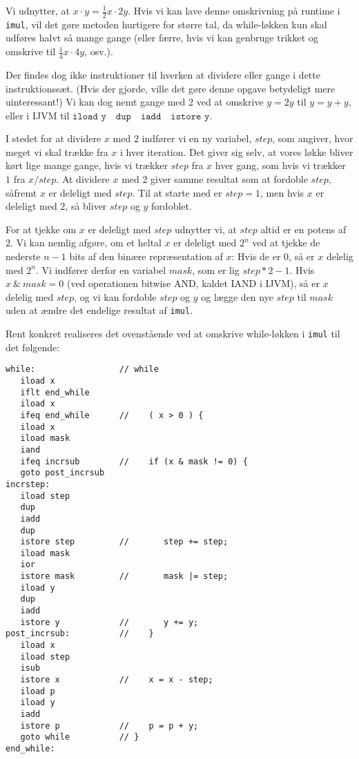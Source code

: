 \documentclass[12pt,a4paper]{article}
\newcommand{\imul}{\texttt{imul}}
\begin{document}
Vi udnytter, at $x\cdot y=\frac 12x\cdot2y$. Hvis vi kan lave denne omskrivning
på runtime i \imul{}, vil det gøre metoden hurtigere for større tal, da
while-løkken kun skal udføres halvt så mange gange (eller færre, hvis vi kan
genbruge trikket og omskrive til $\frac14x\cdot4y$, osv.).

Der findes dog ikke instruktioner til hverken at dividere eller gange i dette
instruktionssæt. (Hvis der gjorde, ville det gøre denne opgave betydeligt mere
uinteressant!) Vi kan dog nemt gange med 2 ved at omskrive $y=2y$ til
$y=y+y$, eller i IJVM til $\texttt{iload y} \quad \texttt{dup} \quad
\texttt{iadd} \quad \texttt{istore y}$.

I stedet for at dividere $x$ med $2$ indfører vi en ny variabel, $step$, som
angiver, hvor meget vi skal trække fra $x$ i hver iteration. Det giver sig
selv, at vores løkke bliver kørt lige mange gange, hvis vi trækker $step$ fra
$x$ hver gang, som hvis vi trækker $1$ fra $x/step$. At dividere $x$ med 2
giver samme resultat som at fordoble $step$, såfremt $x$ er deleligt med
$step$. Til at starte med er $step=1$, men hvis $x$ er deleligt med $2$, så
bliver $step$ og $y$ fordoblet.

For at tjekke om $x$ er deleligt med $step$ udnytter vi, at $step$ altid er en
potens af $2$. Vi kan nemlig afgøre, om et heltal $x$ er deleligt med $2^n$ ved
at tjekke de nederste $n-1$ bits af den binære repræsentation af $x$: Hvis de
er $0$, så er $x$ delelig med $2^n$. Vi indfører derfor en variabel $mask$, som
er lig $step*2-1$. Hvis $x\ \&\ mask=0$ (ved operationen bitwise AND, kaldet
IAND i IJVM), så er $x$ delelig med $step$, og vi kan fordoble $step$ og $y$ og
lægge den nye $step$ til $mask$ uden at ændre det endelige resultat af \imul.

Rent konkret realiseres det ovenstående ved at omskrive while-løkken i \imul{} til det følgende:

\begin{lstlisting}
while:                 // while
   iload x
   iflt end_while
   iload x
   ifeq end_while      //    ( x > 0 ) {
   iload x
   iload mask
   iand
   ifeq incrsub        //    if (x & mask != 0) {
   goto post_incrsub
incrstep:
   iload step
   dup
   iadd
   dup
   istore step         //       step += step;
   iload mask
   ior
   istore mask         //       mask |= step;
   iload y
   dup
   iadd
   istore y            //       y += y;
post_incrsub:          //    }
   iload x
   iload step
   isub
   istore x            //    x = x - step;
   iload p
   iload y
   iadd
   istore p            //    p = p + y;
   goto while          // }
end_while:
\end{lstlisting}
\end{document}
